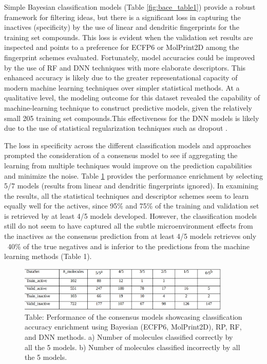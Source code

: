 Simple Bayesian classification models (Table \ref{fig:bace_table1}) provide a robust framework for filtering ideas, but there is a significant loss in capturing the inactives (specificity) by the use of linear and dendritic fingerprints for the training set compounds.  This loss is evident when the validation set results are inspected and points to a preference for ECFP6 or MolPrint2D among the fingerprint schemes evaluated.  Fortunately, model accuracies could be improved by the use of RF and DNN techniques with more elaborate descriptors.  This enhanced accuracy is likely due to the greater representational capacity of modern machine learning techniques over simpler statistical methods.  At a qualitative level, the modeling outcome for this dataset revealed the capability of machine-learning technique to construct predictive models, given the relatively small 205 training set compounds.This effectiveness for the DNN models is likely due to the use of statistical regularization techniques such as dropout \cite{srivastava2014dropout, mendenhall2016improving}.


The loss in specificity across the different classification models and approaches prompted the consideration of a consensus model to see if aggregating the learning from multiple techniques would improve on the prediction capabilities and minimize the noise.  Table \ref{fig:bace_table3} provides the performance enrichment by selecting 5/7 models (results from linear and dendritic fingerprints ignored).  In examining the results, all the statistical techniques and descriptor schemes seem to learn equally well for the actives, since 95\% and 75\% of the training and validation set is retrieved by at least 4/5 models developed.  However, the classification models still do not seem to have captured all the subtle microenvironment effects from the inactives as the consensus prediction from at least 4/5 models retrieves only ~40\% of the true negatives and is inferior to the predictions from the machine learning methods (Table 1). 


\begin{figure}
  \centering
  \includegraphics[width=0.9\textwidth]{Images/bace_table_3.png}
  \caption{Table: Performance of the consensus models showcasing classification accuracy enrichment using Bayesian (ECFP6, MolPrint2D), RP, RF, and DNN methods. a) Number of molecules classified correctly by all the 5 models. b) Number of molecules classified incorrectly by all the 5 models.}
  \label{fig:bace_table3}
\end{figure}


